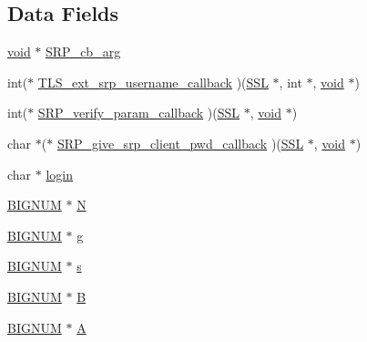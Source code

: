 \subsection*{Data Fields}
\begin{DoxyCompactItemize}
\item 
\hyperlink{hw__4758__cca_8h_afad4d591c7931ff6dc5bf69c76c96aa0}{void} $\ast$ \hyperlink{structsrp__ctx__st_af4421fd99ff06bf892c397584acdf1d5}{S\+R\+P\+\_\+cb\+\_\+arg}
\item 
int($\ast$ \hyperlink{structsrp__ctx__st_a0863b4e23705e67164270059403086a2}{T\+L\+S\+\_\+ext\+\_\+srp\+\_\+username\+\_\+callback} )(\hyperlink{crypto_2ossl__typ_8h_a71f21e09bf365489dab9d85bd4785e24}{S\+SL} $\ast$, int $\ast$, \hyperlink{hw__4758__cca_8h_afad4d591c7931ff6dc5bf69c76c96aa0}{void} $\ast$)
\item 
int($\ast$ \hyperlink{structsrp__ctx__st_ad70b5fe8ecacdddbcce2ae6f2bcc99f6}{S\+R\+P\+\_\+verify\+\_\+param\+\_\+callback} )(\hyperlink{crypto_2ossl__typ_8h_a71f21e09bf365489dab9d85bd4785e24}{S\+SL} $\ast$, \hyperlink{hw__4758__cca_8h_afad4d591c7931ff6dc5bf69c76c96aa0}{void} $\ast$)
\item 
char $\ast$($\ast$ \hyperlink{structsrp__ctx__st_a940baf63a8bc6e8f5704fac03dc9099b}{S\+R\+P\+\_\+give\+\_\+srp\+\_\+client\+\_\+pwd\+\_\+callback} )(\hyperlink{crypto_2ossl__typ_8h_a71f21e09bf365489dab9d85bd4785e24}{S\+SL} $\ast$, \hyperlink{hw__4758__cca_8h_afad4d591c7931ff6dc5bf69c76c96aa0}{void} $\ast$)
\item 
char $\ast$ \hyperlink{structsrp__ctx__st_a6bdc87ebf8486777210fb586a76dd71a}{login}
\item 
\hyperlink{crypto_2ossl__typ_8h_a6fb19728907ec6515e4bfb716bffa141}{B\+I\+G\+N\+UM} $\ast$ \hyperlink{structsrp__ctx__st_aea6e731e3cc1aef110a1dbd1545eeff0}{N}
\item 
\hyperlink{crypto_2ossl__typ_8h_a6fb19728907ec6515e4bfb716bffa141}{B\+I\+G\+N\+UM} $\ast$ \hyperlink{structsrp__ctx__st_a13fc89a0daf188f7de9a2011bc9b051f}{g}
\item 
\hyperlink{crypto_2ossl__typ_8h_a6fb19728907ec6515e4bfb716bffa141}{B\+I\+G\+N\+UM} $\ast$ \hyperlink{structsrp__ctx__st_a174fa2d60f08e563a4405911f6c81172}{s}
\item 
\hyperlink{crypto_2ossl__typ_8h_a6fb19728907ec6515e4bfb716bffa141}{B\+I\+G\+N\+UM} $\ast$ \hyperlink{structsrp__ctx__st_af004f723529f12aa9f6eba50d907cfc6}{B}
\item 
\hyperlink{crypto_2ossl__typ_8h_a6fb19728907ec6515e4bfb716bffa141}{B\+I\+G\+N\+UM} $\ast$ \hyperlink{structsrp__ctx__st_a14b5ee5b9cc93634ae591ff33a985689}{A}

\end{DoxyCompactItemize}
